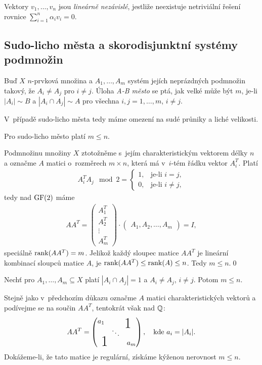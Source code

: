 \df Vektory $v_1,\dots,v_n$ jsou {\it lineárně nezávislé}, jestliže neexistuje netriviální řešení 
rovnice $\sum_{i=1}^n \alpha_iv_i=0$.

\medskip
\subsection{Sudo-licho města a skorodisjunktní systémy podmnožin}


\df Buď $X$ $n$-prvková množina a $A_1,\dots,A_m$ systém jejích neprázdných podmnožin takový, že $A_i \ne A_j$ pro $i\neq j$. Úloha {\it A-B město} se ptá, jak velké může být $m$, je-li $|A_i|\sim B$ a $|A_i\cap A_j|\sim A$ pro všechna $i,j=1,\dots,m$, $i\neq j$.

\medskip
V~případě sudo-licho města tedy máme omezení na sudé průniky a liché velikosti.

\vt Pro sudo-licho město platí $m \leq n$.

\dk Podmnožinu množiny $X$ ztotožněme s~jejím charakteristickým vektorem délky $n$ a označme $A$ matici o~rozměrech $m\times n$, která má v~$i$-tém řádku vektor $A_i^T$. Platí
\begin{align}
A_i^TA_j\!\mod2=\begin{cases}1,&\text{je-li }i=j,\\0,&\text{je-li }i\neq j,\end{cases}
\end{align}
tedy nad $\mathrm{GF}(2)$ máme
\begin{align}
	AA^T = \left(\begin{matrix}A_1^T\\ A_2^T \\ \vdots \\ A_m^T \end{matrix}\right) 
	\cdot \left(\begin{matrix}A_1, A_2, \dots, A_m\end{matrix}\right) = I,
\end{align}
speciálně $\operatorname{rank}(AA^T) = m$. Jelikož každý sloupec matice $AA^T$ je lineární kombinací sloupců matice $A$, je $\operatorname{rank}(AA^T)\leq\operatorname{rank}(A)\leq n$. Tedy $m\leq n$.\qed

\vt Nechť pro $A_1,\dots,A_m\subseteq X$ platí $|A_i \cap A_j| = 1 $ a $A_i \neq A_j$, $i\neq j$. Potom $m \leq n$.

\dk Stejně jako v~předchozím důkazu označme $A$ matici charakteristických vektorů a podívejme se na součin $AA^T$, tentokrát však nad $\mathbb{Q}$:
\begin{align}
	AA^T = \left(\begin{matrix}
	a_1&&\smash{\bigone\quad}\\
	&\ddots&\\
	\smash{\quad\raisebox{5pt}{\bigone}}&&a_m
	\end{matrix}\right),\quad\text{kde }a_i=|A_i|. 
\end{align}
Dokážeme-li, že tato matice je regulární, získáme kýženou nerovnost $m\leq n$.

